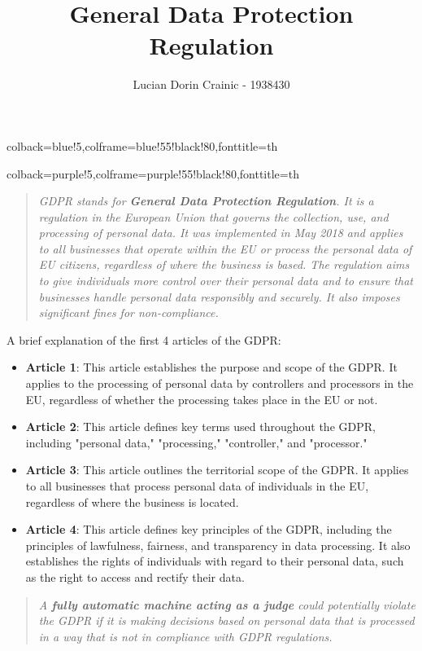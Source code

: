 \documentclass{article}
\title{General Data Protection Regulation}
\author{Lucian Dorin Crainic - 1938430}
\date{}
\begin{document}
%
{colback=blue!5,colframe=blue!55!black!80,fonttitle=\bfseries}{th}

%
{colback=purple!5,colframe=purple!55!black!80,fonttitle=\bfseries}{th}

\maketitle

\begin{quote}
  \textit{
    GDPR stands for \textbf{General Data Protection Regulation}. It 
    is a regulation in the European Union that governs the collection, use, 
    and processing of personal data. It was implemented in May 2018 and applies 
    to all businesses that operate within the EU or process the personal data of 
    EU citizens, regardless of where the business is based. The regulation aims 
    to give individuals more control over their personal data and to ensure that 
    businesses handle personal data responsibly and securely. It also imposes 
    significant fines for non-compliance.
  }
\end{quote}

A brief explanation of the first 4 articles of the GDPR:
\begin{itemize}
  \item \textbf{Article 1}: This article establishes the purpose and scope of the GDPR. It applies to the processing of 
        personal data by controllers and processors in the EU, regardless of whether the processing takes place 
        in the EU or not.
  \item \textbf{Article 2}: This article defines key terms used throughout the GDPR, including "personal data," 
        "processing," "controller," and "processor."
  \item \textbf{Article 3}: This article outlines the territorial scope of the GDPR. It applies to all businesses 
        that process personal data of individuals in the EU, regardless of where the business is located.
  \item \textbf{Article 4}: This article defines key principles of the GDPR, including the principles of lawfulness, 
        fairness, and transparency in data processing. It also establishes the rights of individuals with 
        regard to their personal data, such as the right to access and rectify their data.
\end{itemize}

\begin{quote}
  \textit{
  A \textbf{fully automatic machine acting as a judge} could potentially violate the GDPR if it is making decisions based on 
  personal data that is processed in a way that is not in compliance with GDPR regulations. 
}
\end{quote}
\end{document}
